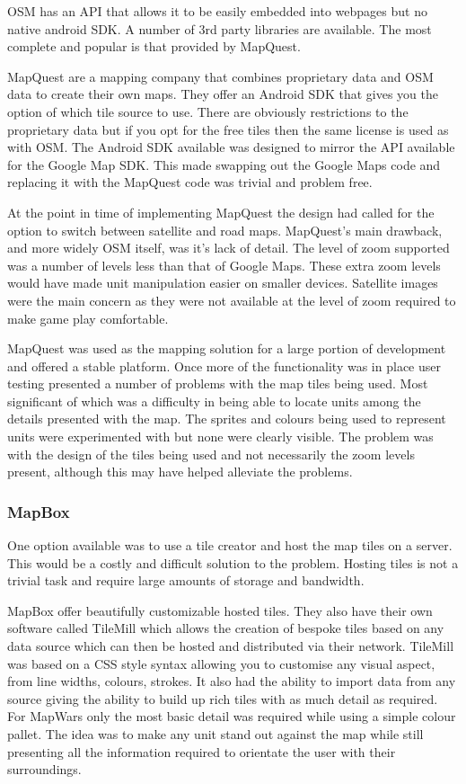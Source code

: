 OSM has an API that allows it to be easily embedded into webpages but no native android SDK. A number of 3rd party libraries are available. The most complete and popular is that provided by MapQuest.

MapQuest are a mapping company that combines proprietary data and OSM data to create their own maps. They offer an Android SDK that gives you the option of which tile source to use. There are obviously restrictions to the proprietary data but if you opt for the free tiles then the same license is used as with OSM. The Android SDK available was designed to mirror the API available for the Google Map SDK. This made swapping out the Google Maps code and replacing it with the MapQuest code was trivial and problem free.

At the point in time of implementing MapQuest the design had called for the option to switch between satellite and road maps. MapQuest's main drawback, and more widely OSM itself, was it's lack of detail. The level of zoom supported was a number of levels less than that of Google Maps. These extra zoom levels would have made unit manipulation easier on smaller devices. Satellite images were the main concern as they were not available at the level of zoom required to make game play comfortable.

MapQuest was used as the mapping solution for a large portion of development and offered a stable platform. Once more of the functionality was in place user testing presented a number of problems with the map tiles being used. Most significant of which was a difficulty in being able to locate units among the details presented with the map. The sprites and colours being used to represent units were experimented with but none were clearly visible. The problem was with the design of the tiles being used and not necessarily the zoom levels present, although this may have helped alleviate the problems.

\subsubsection*{MapBox}
One option available was to use a tile creator and host the map tiles on a server. This would be a costly and difficult solution to the problem. Hosting tiles is not a trivial task and require large amounts of storage and bandwidth.

MapBox offer beautifully customizable hosted tiles. They also have their own software called TileMill which allows the creation of bespoke tiles based on any data source which can then be hosted and distributed via their network. TileMill was based on a CSS style syntax allowing you to customise any visual aspect, from line widths, colours, strokes. It also had the ability to import data from any source giving the ability to build up rich tiles with as much detail as required. For MapWars only the most basic detail was required while using a simple colour pallet. The idea was to make any unit stand out against the map while still presenting all the information required to orientate the user with their surroundings. 

